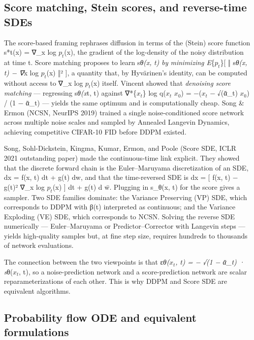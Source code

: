 \documentclass{article}
\begin{document}
\subsection{Score matching, Stein scores, and reverse-time SDEs}\label{score-matching-stein-scores-and-reverse-time-sdes}

The score-based framing rephrases diffusion in terms of the (Stein) score function s*t(x) = ∇\_x log \(p_t\)(x), the gradient of the log-density of the noisy distribution at time t. Score matching \citep{hyvrinen2005estimationofnonnor} proposes to learn s\emph{θ(x, t) by minimizing E}\{\(p_t\)\}{[} ‖ s\emph{θ(x, t) − ∇}x log \(p_t\)(x) ‖² {]}, a quantity that, by Hyvärinen's identity, can be computed without access to ∇\_x log \(p_t\)(x) itself. Vincent \citet{vincent2011aconnectionbetween} showed that \emph{denoising score matching} --- regressing s\emph{θ(x}t, t) against ∇*\{\(x_t\)\} log q(\(x_t\) \textbar{} \(x_0\)) = −(\(x_t\) − √(ᾱ\_t) \(x_0\)) / (1 − ᾱ\_t) --- yields the same optimum and is computationally cheap. Song \& Ermon (NCSN, NeurIPS 2019) trained a single noise-conditioned score network across multiple noise scales and sampled by Annealed Langevin Dynamics, achieving competitive CIFAR-10 FID before DDPM existed.

Song, Sohl-Dickstein, Kingma, Kumar, Ermon, and Poole (Score SDE, ICLR 2021 outstanding paper) made the continuous-time link explicit. They showed that the discrete forward chain is the Euler--Maruyama discretization of an SDE, dx = f(x, t) dt + g(t) dw, and that the time-reversed SDE \citep{anderson1982reversetimestochas} is dx = {[} f(x, t) − g(t)² ∇\_x log \(p_t\)(x) {]} dt + g(t) d w̄. Plugging in s\_θ(x, t) for the score gives a sampler. Two SDE families dominate: the Variance Preserving (VP) SDE, which corresponds to DDPM with β(t) interpreted as continuous; and the Variance Exploding (VE) SDE, which corresponds to NCSN. Solving the reverse SDE numerically --- Euler--Maruyama or Predictor--Corrector with Langevin steps --- yields high-quality samples but, at fine step size, requires hundreds to thousands of network evaluations.

The connection between the two viewpoints is that ε\emph{θ(\(x_t\), t) = − √(1 − ᾱ\_t) · s}θ(\(x_t\), t), so a noise-prediction network and a score-prediction network are scalar reparameterizations of each other. This is why DDPM and Score SDE are equivalent algorithms.

\subsection{Probability flow ODE and equivalent formulations}\label{probability-flow-ode-and-equivalent-formulations}
\end{document}
